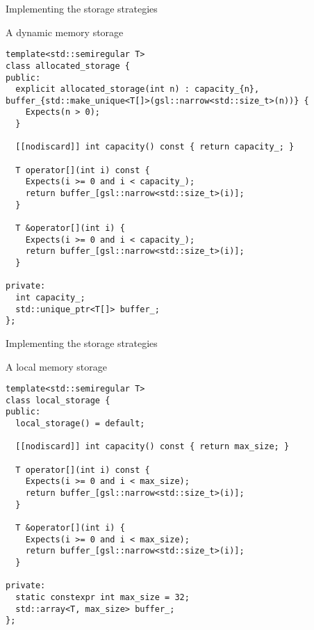 \begin{frame}[t,fragile,shrink=20]{Implementing the storage strategies}
\begin{block}{A dynamic memory storage}
\begin{lstlisting}
template<std::semiregular T>
class allocated_storage {
public:
  explicit allocated_storage(int n) : capacity_{n}, buffer_{std::make_unique<T[]>(gsl::narrow<std::size_t>(n))} {
    Expects(n > 0);
  }

  [[nodiscard]] int capacity() const { return capacity_; }

  T operator[](int i) const {
    Expects(i >= 0 and i < capacity_);
    return buffer_[gsl::narrow<std::size_t>(i)];
  }

  T &operator[](int i) {
    Expects(i >= 0 and i < capacity_);
    return buffer_[gsl::narrow<std::size_t>(i)];
  }

private:
  int capacity_;
  std::unique_ptr<T[]> buffer_;
};
\end{lstlisting}
\end{block}
\end{frame}

\begin{frame}[t,fragile,shrink=20]{Implementing the storage strategies}
\begin{block}{A local memory storage}
\begin{lstlisting}
template<std::semiregular T>
class local_storage {
public:
  local_storage() = default;

  [[nodiscard]] int capacity() const { return max_size; }

  T operator[](int i) const {
    Expects(i >= 0 and i < max_size);
    return buffer_[gsl::narrow<std::size_t>(i)];
  }

  T &operator[](int i) {
    Expects(i >= 0 and i < max_size);
    return buffer_[gsl::narrow<std::size_t>(i)];
  }

private:
  static constexpr int max_size = 32;
  std::array<T, max_size> buffer_;
};
\end{lstlisting}
\end{block}
\end{frame}

